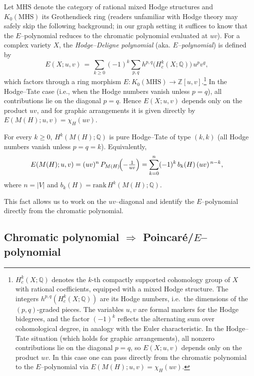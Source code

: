 \documentclass[runningheads]{llncs}
\begin{document}
Let $\mathrm{MHS}$ denote the category of rational mixed Hodge structures and 
$K_0(\mathrm{MHS})$ its Grothendieck ring \cite{OrlikTerao1992,Dimca2017}
(readers unfamiliar with Hodge theory may safely skip the following 
background; in our graph setting it suffices to know that the $E$–polynomial 
reduces to the chromatic polynomial evaluated at $uv$). 
For a complex variety $X$, the \emph{Hodge--Deligne polynomial} 
(aka. \emph{$E$--polynomial}) is defined by
\[
E(X;u,v) \,=\, \sum_{k\ge 0} (-1)^k \sum_{p,q} h^{p,q}\!\big(H_c^k(X;\mathbb{Q})\big)\, u^p v^q,
\]
which factors through a ring morphism 
$E:K_0(\mathrm{MHS}) \to \mathbb{Z}[u,v]$.\footnote{$H_c^k(X;\mathbb{Q})$ denotes the $k$-th compactly supported cohomology group of $X$ with rational coefficients, equipped with a mixed Hodge structure. 
The integers $h^{p,q}(H_c^k(X;\mathbb{Q}))$ are its Hodge numbers, i.e.\ the 
dimensions of the $(p,q)$-graded pieces. The variables $u,v$ are formal markers 
for the Hodge bidegrees, and the factor $(-1)^k$ reflects the alternating sum 
over cohomological degree, in analogy with the Euler characteristic. 
In the Hodge--Tate situation (which holds for graphic arrangements), 
all nonzero contributions lie on the diagonal $p=q$, so $E(X;u,v)$ depends only 
on the product $uv$. In this case one can pass directly from the chromatic 
polynomial to the $E$--polynomial via $E(M(H);u,v)=\chi_H(uv)$.}
In the Hodge--Tate case (i.e., when the Hodge numbers vanish unless $p=q$), 
all contributions lie on the diagonal $p=q$. 
Hence $E(X;u,v)$ depends only on the product $uv$, and for graphic arrangements 
it is given directly by $E(M(H);u,v)=\chi_H(uv)$.

\begin{proposition}
\label{prop:purity-graphic}
For every $k\ge 0$, $H^k(M(H);\mathbb{Q})$ is pure Hodge--Tate of type $(k,k)$ 
(all Hodge numbers vanish unless $p=q=k$). Equivalently,
\[
E(M(H);u,v)=(uv)^{n}\,P_{M(H)}\!\Bigl(-\tfrac{1}{uv}\Bigr)
=\sum_{k=0}^{n}(-1)^k\,b_k(H)\,(uv)^{\,n-k},
\]
where $n=|V|$ and $b_k(H)=\mathrm{rank}\,H^k(M(H);\mathbb{Q})$.
\end{proposition}


This fact allows us to work on the $uv$–diagonal and identify the $E$–polynomial 
directly from the chromatic polynomial.

\subsection{Chromatic polynomial $\Rightarrow$ Poincaré/$E$–polynomial}
\end{document}
